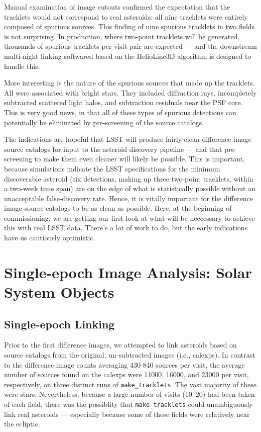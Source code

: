 Manual examination of image cutouts confirmed the expectation that the tracklets would not correspond to real asteroids: all nine tracklets were entirely composed of spurious sources. This finding of nine spurious tracklets in two fields is not surprising. In production, where two-point tracklets will be generated, thousands of spurious tracklets per visit-pair are expected --- and the downstream multi-night linking softwared based on the HelioLinc3D algorithm is designed to handle this.

More interesting is the nature of the spurious sources that made up the tracklets. All were associated with bright stars. They included diffraction rays, incompletely subtracted scattered light halos, and subtraction residuals near the PSF core. This is very good news, in that all of these types of spurious detections can potentially be eliminated by pre-screening of the source catalogs.

The indications are hopeful that LSST will produce fairly clean difference image source catalogs for input to the asteroid discovery pipeline --- and that pre-screening to make them even cleaner will likely be possible. This is important, because simulations indicate the LSST specifications for the minimum discoverable asteroid (six detections, making up three two-point tracklets, within a two-week time span) are on the edge of what is statistically possible without an unacceptable false-discovery rate. Hence, it is vitally important for the difference image source catalogs to be as clean as possible. Here, at the beginning of commissioning, we are getting our first look at what will be neccessary to achieve this with real LSST data. There's a lot of work to do, but the early indications have us cautiously optimistic.

\section{Single-epoch Image Analysis: Solar System Objects}
\label{sec:sia_solar_system}

\subsection{Single-epoch Linking}
\label{sec:linking}

Prior to the first difference images, we attempted to link asteroids based on source catalogs from the original, un-subtracted images (i.e., calexps). In contrast to the difference image counts averaging 430-840 sources per visit, the average number of sources found on the calexps were 11000, 16000, and 23000 per visit, respectively, on three distinct runs of {\tt make\_tracklets}. The vast majority of these were stars. Nevertheless, because a large number of visits (10--20) had been taken of each field, there was the possiblity that {\tt make\_tracklets} could unambiguously link real asteroids --- especially because some of these fields were relatively near the ecliptic.

